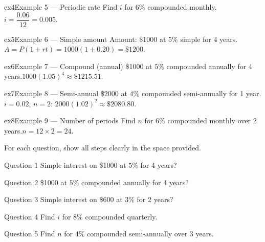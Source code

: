 \documentclass[11pt]{article}
\begin{document}
\begin{example}{ex4}{Example 5 --- Periodic rate}
Find $i$ for $6\%$ compounded monthly.\soln $i=\dfrac{0.06}{12}=0.005$.
\end{example}

\begin{example}{ex5}{Example 6 --- Simple amount}
Amount: \$1000 at $5\%$ simple for 4 years.\soln $A=P(1+rt)=1000(1+0.20)=\$1200$.
\end{example}

\begin{example}{ex6}{Example 7 --- Compound (annual)}
\$1000 at $5\%$ compounded annually for 4 years.\soln $1000(1.05)^4\approx\$1215.51$.
\end{example}

\begin{example}{ex7}{Example 8 --- Semi-annual}
\$2000 at $4\%$ compounded semi-annually for 1 year.\soln $i=0.02$, $n=2$: $2000(1.02)^2\approx\$2080.80$.
\end{example}

\begin{example}{ex8}{Example 9 --- Number of periods}
Find $n$ for $6\%$ compounded monthly over 2 years.\soln $n=12\times2=24$.
\end{example}

\clearpage
{}
For each question, show all steps clearly in the space provided.

\begin{qbox}{Question 1}
Simple interest on \$1000 at $5\%$ for 4 years?\workspace{2.4cm}
\end{qbox}

\begin{qbox}{Question 2}
\$1000 at $5\%$ compounded annually for 4 years?\workspace{2.4cm}
\end{qbox}

\begin{qbox}{Question 3}
Simple interest on \$600 at $3\%$ for 2 years?\workspace{2.4cm}
\end{qbox}

\begin{qbox}{Question 4}
Find $i$ for $8\%$ compounded quarterly.\workspace{2.4cm}
\end{qbox}

\begin{qbox}{Question 5}
Find $n$ for $4\%$ compounded semi-annually over 3 years.\workspace{2.4cm}
\end{qbox}
\end{document}
